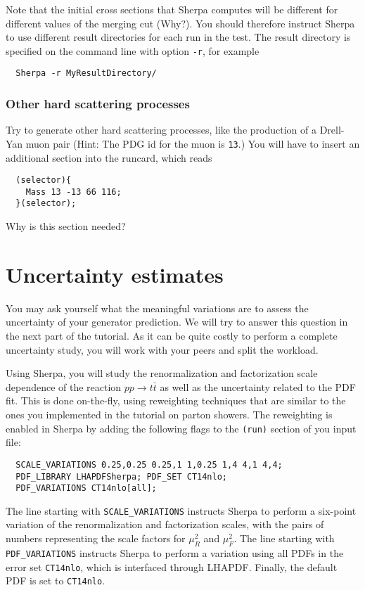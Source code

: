 \documentclass[10pt]{article}
\begin{document}
Note that the initial cross sections that Sherpa computes will be different 
for different values of the merging cut (Why?). You should therefore instruct 
Sherpa to use different result directories for each run in the test. 
The result directory is specified on the command line with option {\tt -r},
for example
\begin{verbatim}
  Sherpa -r MyResultDirectory/
\end{verbatim}

\subsubsection{Other hard scattering processes}

Try to generate other hard scattering processes, like the production
of a Drell-Yan muon pair (Hint: The PDG id for the muon is {\tt 13}.)
You will have to insert an additional section into the runcard, which
reads
\begin{verbatim}
  (selector){
    Mass 13 -13 66 116;
  }(selector);
\end{verbatim}
Why is this section needed?

\section{Uncertainty estimates}

You may ask yourself what the meaningful variations are to assess
the uncertainty of your generator prediction. We will try to answer this
question in the next part of the tutorial. As it can be quite costly 
to perform a complete uncertainty study, you will work with your peers 
and split the workload.

Using Sherpa, you will study the renormalization and factorization
scale dependence of the reaction $pp\to t\bar{t}$ as well as the uncertainty
related to the PDF fit. This is done on-the-fly, using reweighting techniques
that are similar to the ones you implemented in the tutorial on parton showers.
The reweighting is enabled in Sherpa by adding the following flags to the
{\tt (run)} section of you input file:
\begin{verbatim}
  SCALE_VARIATIONS 0.25,0.25 0.25,1 1,0.25 1,4 4,1 4,4;
  PDF_LIBRARY LHAPDFSherpa; PDF_SET CT14nlo;
  PDF_VARIATIONS CT14nlo[all];
\end{verbatim}
The line starting with {\tt SCALE\_VARIATIONS} instructs Sherpa to perform a
six-point variation of the renormalization and factorization scales,
with the pairs of numbers representing the scale factors for $\mu_R^2$
and $\mu_F^2$. The line starting with {\tt PDF\_VARIATIONS} instructs Sherpa
to perform a variation using all PDFs in the error set {\tt CT14nlo}, which
is interfaced through LHAPDF. Finally, the default PDF is set to {\tt CT14nlo}.
\end{document}
